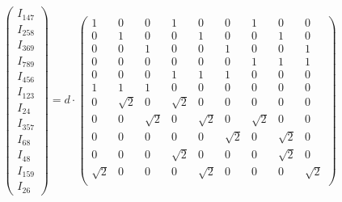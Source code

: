     \begin{equation}
        \begin{pmatrix}
            I_{147} \\
            I_{258} \\
            I_{369} \\
            I_{789} \\
            I_{456} \\
            I_{123} \\
            I_{24}  \\
            I_{357} \\
            I_{68}  \\
            I_{48}  \\
            I_{159} \\
            I_{26}
        \end{pmatrix}
        = d \cdot
        \begin{pmatrix}
            1        & 0        & 0        & 1        & 0        & 0        & 1        & 0        & 0        \\
            0        & 1        & 0        & 0        & 1        & 0        & 0        & 1        & 0        \\
            0        & 0        & 1        & 0        & 0        & 1        & 0        & 0        & 1        \\
            0        & 0        & 0        & 0        & 0        & 0        & 1        & 1        & 1        \\
            0        & 0        & 0        & 1        & 1        & 1        & 0        & 0        & 0        \\
            1        & 1        & 1        & 0        & 0        & 0        & 0        & 0        & 0        \\
            0        & \sqrt{2} & 0        & \sqrt{2} & 0        & 0        & 0        & 0        & 0        \\
            0        & 0        & \sqrt{2} & 0        & \sqrt{2} & 0        & \sqrt{2} & 0        & 0        \\
            0        & 0        & 0        & 0        & 0        & \sqrt{2} & 0        & \sqrt{2} & 0        \\
            0        & 0        & 0        & \sqrt{2} & 0        & 0        & 0        & \sqrt{2} & 0        \\
            \sqrt{2} & 0        & 0        & 0        & \sqrt{2} & 0        & 0        & 0        & \sqrt{2} \\

\end{pmatrix}
\end{equation}
